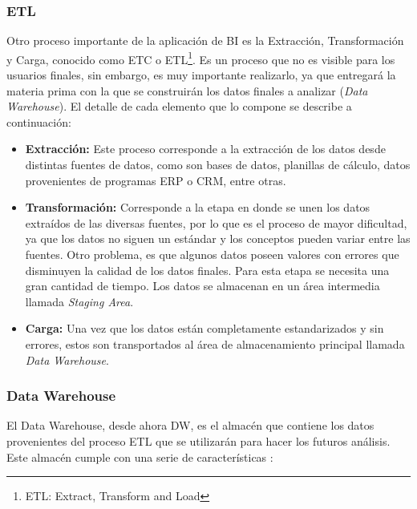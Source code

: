 \documentclass[letter,12pt,oneside]{report}
\begin{document}
\subsubsection{ETL}
Otro proceso importante de la aplicación de BI es la Extracción, Transformación y Carga, conocido como ETC o ETL\footnote{ETL: Extract, Transform and Load}. Es un proceso que no es visible para los usuarios finales, sin embargo, es muy importante realizarlo, ya que entregará la materia prima con la que se construirán los datos finales a analizar (\textit{Data Warehouse}). El detalle de cada elemento que lo compone se describe a continuación:

\begin{itemize}
\item\textbf{Extracción:} Este proceso corresponde a la extracción de los datos desde distintas fuentes de datos, como son bases de datos, planillas de cálculo, datos provenientes de programas ERP o CRM, entre otras.
\item \textbf{Transformación:} Corresponde a la etapa en donde se unen los datos extraídos de las diversas fuentes, por lo que es el proceso de mayor dificultad, ya que los datos no siguen un estándar y los conceptos pueden variar entre las fuentes. Otro problema, es que algunos datos poseen valores con errores que disminuyen la calidad de los datos finales. Para esta etapa se necesita una gran cantidad de tiempo. Los datos se almacenan en un área intermedia llamada \textit{Staging Area}.
\item \textbf{Carga:} Una vez que los datos están completamente estandarizados y sin errores, estos son transportados al área de almacenamiento principal llamada \textit{Data Warehouse}.
\end{itemize}

\subsubsection{Data Warehouse}
El Data Warehouse, desde ahora DW, es el almacén que contiene los datos provenientes del proceso ETL que se utilizarán para hacer los futuros análisis. Este almacén cumple con una serie de características \cite{P4}:
\end{document}
